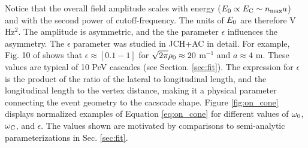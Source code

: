 \documentclass[amsmath,amssymb,aps,prd,10pt,twocolumn]{revtex4}
\begin{document}
Notice that the overall field amplitude scales with energy ($E_{\rm 0} \propto E_{\rm C} \sim n_{\rm max} a$) and with the second power of cutoff-frequency.  The units of $E_{\rm 0}$ are therefore V Hz$^2$.  The amplitude is asymmetric, and the the parameter $\epsilon$ influences the asymmetry.  The $\epsilon$ parameter was studied in JCH+AC in detail.  For example, Fig. 10 of \cite{10.1016/j.astropartphys.2017.03.008} shows that $\epsilon \approx [0.1 - 1]$ for $\sqrt{2\pi} \rho_{\rm 0} \approx 20$ m$^{-1}$ and $a \approx 4$ m.  These values are typical of 10 PeV cascades (see Section. \ref{sec:fit}).  The expression for $\epsilon$ is the product of the ratio of the lateral to longitudinal length, and the longitudinal length to the vertex distance, making it a physical parameter connecting the event geometry to the cacscade shape.  Figure \ref{fig:on_cone} displays normalized examples of Equation \ref{eq:on_cone} for different values of $\omega_{\rm 0}$, $\omega_{\rm C}$, and $\epsilon$.  The values shown are motivated by comparisons to semi-analytic parameterizations in Sec. \ref{sec:fit}.
\end{document}
